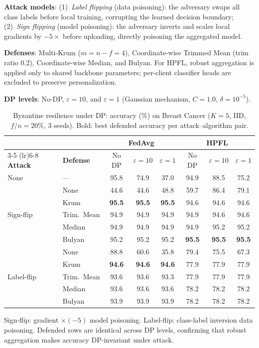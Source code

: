 \documentclass[conference]{IEEEtran}
\begin{document}
\textbf{Attack models}: (1)~\textit{Label flipping} (data poisoning): the adversary swaps all class labels before local training, corrupting the learned decision boundary; (2)~\textit{Sign flipping} (model poisoning): the adversary inverts and scales local gradients by $-5\times$ before uploading, directly poisoning the aggregated model.

\textbf{Defenses}: Multi-Krum ($m{=}n{-}f{=}4$), Coordinate-wise Trimmed Mean (trim ratio 0.2), Coordinate-wise Median, and Bulyan. For HPFL, robust aggregation is applied only to shared backbone parameters; per-client classifier heads are excluded to preserve personalization.

\textbf{DP levels}: No-DP, $\varepsilon{=}10$, and $\varepsilon{=}1$ (Gaussian mechanism, $C{=}1.0$, $\delta{=}10^{-5}$).

\begin{table}[htbp]
\centering
\caption{Byzantine resilience under DP: accuracy (\%) on Breast Cancer ($K{=}5$, IID, $f/n{=}20\%$, 3 seeds). Bold: best defended accuracy per attack--algorithm pair.}
\label{tab:byzantine_dp}
\small
\begin{tabular}{ll ccc ccc}
\toprule
& & \multicolumn{3}{c}{\textbf{FedAvg}} & \multicolumn{3}{c}{\textbf{HPFL}} \\
\cmidrule(lr){3-5} \cmidrule(lr){6-8}
\textbf{Attack} & \textbf{Defense} & No DP & $\varepsilon{=}10$ & $\varepsilon{=}1$ & No DP & $\varepsilon{=}10$ & $\varepsilon{=}1$ \\
\midrule
None & --- & 95.8 & 74.9 & 37.0 & 94.9 & 88.5 & 75.2 \\
\midrule
\multirow{5}{*}{Sign-flip}
 & None & 44.6 & 44.6 & 48.8 & 59.7 & 86.4 & 79.1 \\
 & Krum & \textbf{95.5} & \textbf{95.5} & \textbf{95.5} & 94.6 & 94.6 & 94.6 \\
 & Trim.\ Mean & 94.9 & 94.9 & 94.9 & 94.9 & 94.6 & 94.6 \\
 & Median & 94.9 & 94.9 & 94.9 & 94.9 & 95.2 & 95.2 \\
 & Bulyan & 95.2 & 95.2 & 95.2 & \textbf{95.5} & \textbf{95.5} & \textbf{95.5} \\
\midrule
\multirow{5}{*}{Label-flip}
 & None & 88.8 & 60.6 & 35.8 & 79.4 & 75.5 & 67.3 \\
 & Krum & \textbf{94.6} & \textbf{94.6} & \textbf{94.6} & 77.9 & 77.9 & 77.9 \\
 & Trim.\ Mean & 93.6 & 93.6 & 93.3 & 77.9 & 77.9 & 77.9 \\
 & Median & 93.6 & 93.6 & 93.6 & 78.2 & 78.2 & 78.2 \\
 & Bulyan & 93.9 & 93.9 & 93.9 & 78.2 & 78.2 & 78.2 \\
\bottomrule
\end{tabular}

\vspace{1mm}
\footnotesize{Sign-flip: gradient $\times (-5)$ model poisoning. Label-flip: class-label inversion data poisoning. Defended rows are identical across DP levels, confirming that robust aggregation makes accuracy DP-invariant under attack.}
\end{table}
\end{document}
